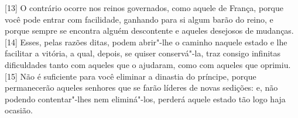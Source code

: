 {[}13{]} O contrário ocorre nos reinos governados, como aquele de
França, porque você pode entrar com facilidade, ganhando para si algum
barão do reino, e porque sempre se encontra alguém descontente e aqueles
desejosos de mudanças. {[}14{]} Esses, pelas razões
ditas, podem abrir"-lhe o caminho naquele estado e lhe facilitar a
vitória, a qual, depois, se quiser conservá"-la, traz consigo infinitas
dificuldades tanto com aqueles que o ajudaram, como com aqueles que
oprimiu. {[}15{]} Não é suficiente para você eliminar a dinastia do
príncipe, porque permanecerão aqueles senhores que se farão líderes de
novas sedições: e, não podendo contentar"-lhes nem eliminá"-los, perderá
aquele estado tão logo haja ocasião.

